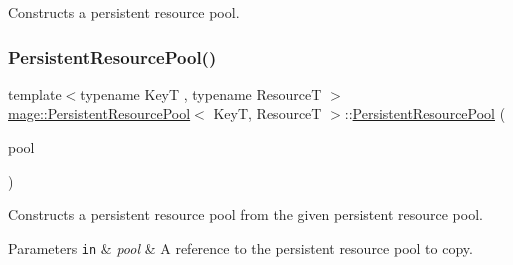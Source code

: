 Constructs a persistent resource pool. \hypertarget{classmage_1_1_persistent_resource_pool_af49749cabca4e6e16b2c073f6f550e0b}{}\label{classmage_1_1_persistent_resource_pool_af49749cabca4e6e16b2c073f6f550e0b} 
\subsubsection{\texorpdfstring{Persistent\+Resource\+Pool()}{PersistentResourcePool()}\hspace{0.1cm}{\footnotesize\ttfamily [2/3]}}
{\footnotesize\ttfamily template$<$typename KeyT , typename ResourceT $>$ \\
\hyperlink{classmage_1_1_persistent_resource_pool}{mage\+::\+Persistent\+Resource\+Pool}$<$ KeyT, ResourceT $>$\+::\hyperlink{classmage_1_1_persistent_resource_pool}{Persistent\+Resource\+Pool} (\begin{DoxyParamCaption}\item[{const \hyperlink{classmage_1_1_persistent_resource_pool}{Persistent\+Resource\+Pool}$<$ KeyT, ResourceT $>$ \&}]{pool }\end{DoxyParamCaption})\hspace{0.3cm}{\ttfamily [delete]}}

Constructs a persistent resource pool from the given persistent resource pool.


\begin{DoxyParams}[1]{Parameters}
\mbox{\tt in}  & {\em pool} & A reference to the persistent resource pool to copy. \\
\hline
\end{DoxyParams}
\hypertarget{classmage_1_1_persistent_resource_pool_a74c46a17cc52d5570a3fd0b7a6bceb81}{}\label{classmage_1_1_persistent_resource_pool_a74c46a17cc52d5570a3fd0b7a6bceb81} 
